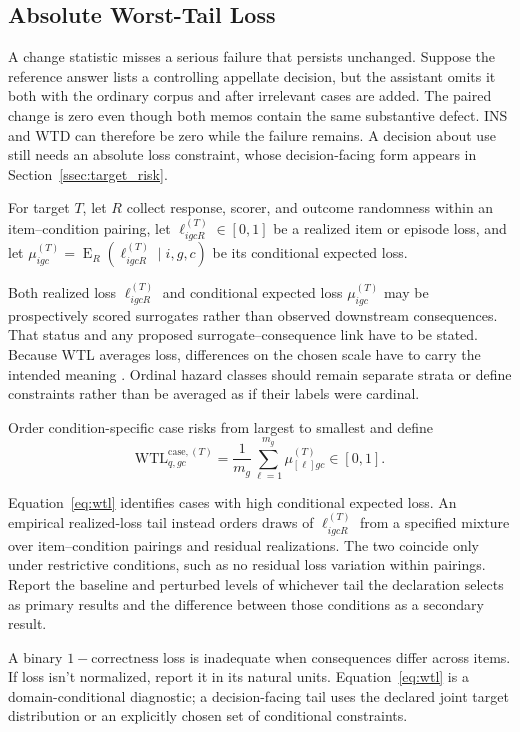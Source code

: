 \documentclass[12pt]{article}
\newcommand{\wtl}{\mathrm{WTL}}
\begin{document}
\subsection{Absolute Worst-Tail Loss}\label{ssec:wtl}

A change statistic misses a serious failure that persists unchanged. Suppose the reference answer lists a controlling appellate decision, but the assistant omits it both with the ordinary corpus and after irrelevant cases are added. The paired change is zero even though both memos contain the same substantive defect. INS and WTD can therefore be zero while the failure remains. A decision about use still needs an absolute loss constraint, whose decision-facing form appears in Section~\ref{ssec:target_risk}.

For target \(T\), let \(R\) collect response, scorer, and outcome randomness within an item--condition pairing, let \(\ell^{(T)}_{igcR}\in[0,1]\) be a realized item or episode loss, and let \(\mu^{(T)}_{igc}=\operatorname{E}_R(\ell^{(T)}_{igcR}\mid i,g,c)\) be its conditional expected loss.

Both realized loss \(\ell^{(T)}_{igcR}\) and conditional expected loss \(\mu^{(T)}_{igc}\) may be prospectively scored surrogates rather than observed downstream consequences. That status and any proposed surrogate--consequence link have to be stated. Because WTL averages loss, differences on the chosen scale have to carry the intended meaning \citep{KeeneyRaiffa1993}. Ordinal hazard classes should remain separate strata or define constraints rather than be averaged as if their labels were cardinal.

Order condition-specific case risks from largest to smallest and define
\begin{equation}\label{eq:wtl}
\wtl^{\mathrm{case},(T)}_{q,gc}
=\frac{1}{m_g}\sum_{\ell=1}^{m_g}\mu^{(T)}_{[\ell]gc}
\in[0,1].
\end{equation}

Equation~\ref{eq:wtl} identifies cases with high conditional expected loss. An empirical realized-loss tail instead orders draws of \(\ell^{(T)}_{igcR}\) from a specified mixture over item--condition pairings and residual realizations. The two coincide only under restrictive conditions, such as no residual loss variation within pairings. Report the baseline and perturbed levels of whichever tail the declaration selects as primary results and the difference between those conditions as a secondary result.

A binary \(1-\text{correctness}\) loss is inadequate when consequences differ across items. If loss isn't normalized, report it in its natural units. Equation~\ref{eq:wtl} is a domain-conditional diagnostic; a decision-facing tail uses the declared joint target distribution or an explicitly chosen set of conditional constraints.
\end{document}
